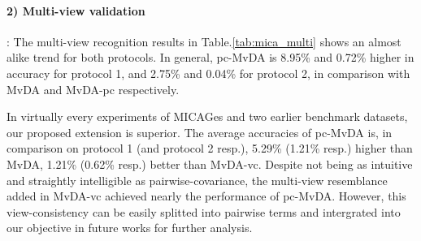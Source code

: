     \paragraph{2) Multi-view validation}: The multi-view recognition results in Table.\ref{tab:mica_multi} shows an almost alike trend for both protocols. In general, pc-MvDA is 8.95\% and 0.72\% higher in accuracy for protocol 1, and 2.75\% and 0.04\% for protocol 2, in comparison with MvDA and MvDA-pc respectively.

    In virtually every experiments of MICAGes and two earlier benchmark datasets, our proposed extension is superior. The average accuracies of pc-MvDA is, in comparison on protocol 1 (and protocol 2 resp.), 5.29\% (1.21\% resp.) higher than MvDA, 1.21\% (0.62\% resp.) better than MvDA-vc. Despite not being as intuitive and straightly intelligible as pairwise-covariance, the multi-view resemblance added in MvDA-vc achieved nearly the performance of pc-MvDA. However, this view-consistency can be easily splitted into pairwise terms and intergrated into our objective in future works for further analysis.

    \begin{table}[htbp]
    \centering
    \caption{Multi-view recognition comparison on MICAGes dataset}
    \label{tab:mica_multi}
    \end{table}

